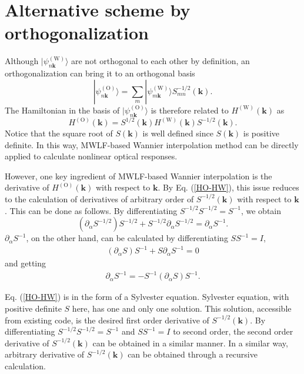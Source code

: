 \section{Alternative scheme by orthogonalization\label{sec:orthogonalization}}

Although $|\psi^{(\text{W})}_{n\boldsymbol{k}}\rangle$ are not orthogonal to each other by definition, an orthogonalization can bring it to an orthogonal basis
\begin{equation}
|\psi^{(\text{O})}_{n\boldsymbol{k}}\rangle=
\sum_m |\psi^{(\text{W})}_{m\boldsymbol{k}}\rangle S^{-1/2}_{mn}(\boldsymbol{k}).
\end{equation}
The Hamiltonian in the basis of $|\psi^{(\text{O})}_{n\boldsymbol{k}}\rangle$ is therefore related to $H^{(\text{W})}(\boldsymbol{k})$ as
\begin{equation}
H^{(\text{O})}(\boldsymbol{k})=S^{1/2}(\boldsymbol{k})H^{(\text{W})}(\boldsymbol{k})S^{-1/2}(\boldsymbol{k}).\label{HO-HW}
\end{equation}
Notice that the square root of $S(\boldsymbol{k})$ is well defined since $S(\boldsymbol{k})$ is positive definite. In this way, MWLF-based Wannier interpolation method can be directly applied to calculate nonlinear optical responses.

However, one key ingredient of MWLF-based Wannier interpolation is the derivative of $H^{(\text{O})}(\boldsymbol{k})$ with respect to $\boldsymbol{k}$. By Eq. (\ref{HO-HW}), this issue reduces to the calculation of derivatives of arbitrary order of $S^{-1/2}(\boldsymbol{k})$ with respect to $\boldsymbol{k}$ . This can be done as follows. By differentiating $S^{-1/2}S^{-1/2}=S^{-1}$, we obtain
\begin{equation}
(\partial_{\alpha}S^{-1/2})S^{-1/2}+S^{-1/2}\partial_{\alpha}S^{-1/2}=\partial_{\alpha}S^{-1}.\label{dS1/2-1}
\end{equation}
$\partial_{\alpha}S^{-1}$, on the other hand, can be calculated by differentiating $SS^{-1}=I$,
\begin{align}
(\partial_{\alpha}S)S^{-1}+S\partial_{\alpha}S^{-1}=0
\end{align}
and getting
\begin{align}
\partial_{\alpha}S^{-1} = -S^{-1}(\partial_{\alpha}S)S^{-1}.
\end{align}

Eq. (\ref{HO-HW}) is in the form of a Sylvester equation\cite{sylvester}. Sylvester equation, with positive definite $S$ here, has one and only one solution. This solution, accessible from existing code\cite{laug}, is the desired first order derivative of $S^{-1/2}(\boldsymbol{k})$. By differentiating $S^{-1/2}S^{-1/2}=S^{-1}$ and $SS^{-1}=I$ to second order, the second order derivative of $S^{-1/2}(\boldsymbol{k})$ can be obtained in a similar manner. In a similar way, arbitrary derivative of $S^{-1/2}(\boldsymbol{k})$ can be obtained through a recursive calculation.

